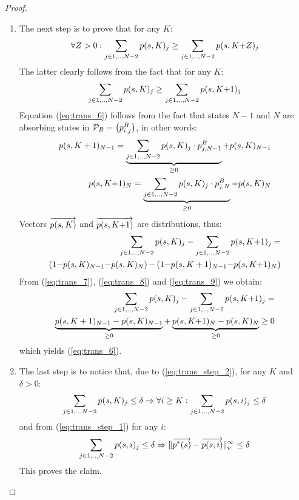 \documentclass{entcs}
\begin{document}
{\begin{proof}
\begin{enumerate}
					\item The next step is to prove that for any $K$:
						\begin{equation}
							\forall Z > 0 : \sum_{j \in 1,..,N-2} p(s,K)_{j} \geq \sum_{j \in 1,..,N-2} p(s,K{+}Z)_{j}
							\label{eq:trans_step_2}
						\end{equation}
						The latter clearly follows from the fact that for any $K$:
						\begin{equation}
							\sum_{j \in 1,..,N-2} p(s,K)_{j} \geq \sum_{j \in 1,..,N-2} p(s,K{+}1)_{j} \label{eq:trans_6}
						\end{equation}
						Equation (\ref{eq:trans_6}) follows from the fact that states $N-1$ and $N$ are absorbing states in $\mathcal{P}_{B}=\left( p^{B}_{i,j} \right)$, in other words:
						\begin{eqnarray}
							p(s,K+1)_{N{-}1} = \underbrace{\sum_{j \in 1,..,N-2} p(s,K)_{j} \cdot p^{B}_{j,N-1}}_{\geq 0} + p(s,K)_{N{-}1} \label{eq:trans_7} \\
							p(s,K{+}1)_{N} = \underbrace{\sum_{j \in 1,..,N-2} p(s,K)_{j} \cdot p^{B}_{j,N}}_{\geq 0} + p(s,K)_{N} \label{eq:trans_8}
						\end{eqnarray}
						Vectors $\overrightarrow{p(s,K)}$ and $\overrightarrow{p(s,K{+}1)}$ are distributions, thus:
						\begin{eqnarray}
							\sum_{j \in 1,..,N-2} p(s,K)_{j} - \sum_{j \in 1,..,N-2} p(s,K{+}1)_{j} = \nonumber \\
							\left(1{-}p(s,K)_{N{-}1}{-}p(s,K)_{N} \right){-}\left(1{-}p(s,K+1)_{N{-}1}{-}p(s,K{+}1)_{N} \right) \label{eq:trans_9}
						\end{eqnarray}
						From (\ref{eq:trans_7}), (\ref{eq:trans_8}) and (\ref{eq:trans_9}) we obtain:
						\begin{eqnarray}
							\sum_{j \in 1,..,N-2} p(s,K)_{j} - \sum_{j \in 1,..,N-2} p(s,K{+}1)_{j} = \nonumber \\ \underbrace{p(s,K+1)_{N{-}1} - p(s,K)_{N{-}1}}_{\geq 0} + \underbrace{ p(s,K{+}1)_{N} -  p(s,K)_{N}}_{\geq 0} \geq 0 \nonumber
						\end{eqnarray}
						which yields (\ref{eq:trans_6}).
					
					\item The last step is to notice that, due to (\ref{eq:trans_step_2}), for any $K$ and $\delta > 0$:
						\[
							\sum_{j \in 1,..,N-2} p(s,K)_{j} \leq \delta \Rightarrow \forall i \geq K : \sum_{j \in 1,..,N-2} p(s,i)_{j} \leq \delta
						\]
						and from (\ref{eq:trans_step_1}) for any $i$:
						\[
							\sum_{j \in 1,..,N-2} p(s,i)_{j} \leq \delta \Rightarrow \lVert  \overrightarrow{p^{*}(s)} - \overrightarrow{p(s,i)}  \rVert_{v}^{\infty} \leq \delta
						\]
						This proves the claim. 
				\end{enumerate}
			\end{proof}
		}
	
\end{document}
